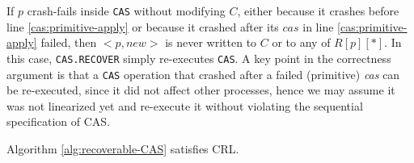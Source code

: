 If $p$ crash-fails inside \texttt{CAS} without modifying $C$, either because it crashes before line \ref{cas:primitive-apply} or because it crashed after its $cas$ in line \ref{cas:primitive-apply} failed, then ${<}p,new{>}$ is never written to $C$ or to any of $R[p][*]$. In this case, \texttt{CAS.RECOVER} simply re-executes  \texttt{CAS}. A key point in the correctness argument is that a \texttt{CAS} operation that crashed after a failed (primitive) \emph{cas} can be re-executed, since it did not affect other processes, hence we may assume it was not linearized yet and re-execute it without violating the sequential specification of CAS.

\begin{lemma}
\label{lemma:CAS-alg-is-CRL}
	Algorithm \ref{alg:recoverable-CAS} satisfies CRL.
\end{lemma}

